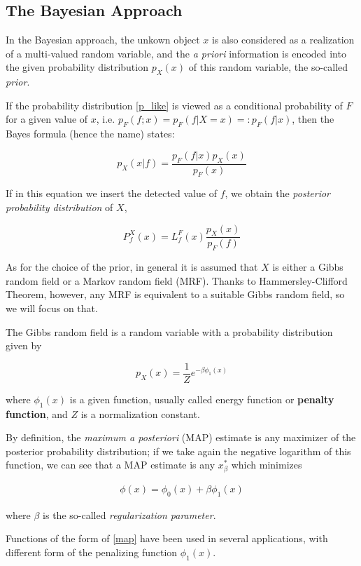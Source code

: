 \subsection{The Bayesian Approach}
\label{bayesian_framework}

In the Bayesian approach, the unkown object $x$ is also considered as a realization of a multi-valued random variable, and the \emph{a priori} information is encoded into the given probability distribution $p_X(x)$ of this random variable, the so-called \emph{prior}.

If the probability distribution \eqref{p_like} is viewed as a conditional probability of $F$ for a given value of $x$, i.e. $p_F (f;x) = p_F (f|X=x)  =: p_F(f|x)$, then the Bayes formula (hence the name) states:

$$p_X(x|f) = \dfrac{p_F(f|x)p_X(x)}{p_F(x)}$$

If in this equation we insert the detected value of $f$, we obtain the \emph{posterior probability distribution} of $X$,

$$P_f^X(x) = L_f^F(x)\dfrac{p_X(x)}{p_F(f)}$$

As for the choice of the prior, in general it is assumed that $X$ is either a Gibbs random field or a Markov random field (MRF). Thanks to Hammersley-Clifford Theorem, however, any MRF is equivalent to a suitable Gibbs random field, so we will focus on that.

The Gibbs random field is a random variable with a probability distribution given by

$$p_X(x) = \dfrac{1}{Z} e^{-\beta \phi_1(x)}$$

where $\phi_1(x)$ is a given function, usually called energy function or \textbf{penalty function}, and $Z$ is a normalization constant.

By definition, the \emph{maximum a posteriori} (MAP) estimate is any maximizer of the posterior probability distribution; if we take again the negative logarithm of this function, we can see that a MAP estimate is any $x_\beta^*$ which minimizes

\begin{align}
\label{map}
\phi(x) = \phi_0 (x)+ \beta \phi_1 (x)
\end{align}

where $\beta$ is the so-called \emph{regularization parameter}.

Functions of the form of \eqref{map} have been used in several applications, with different form of the penalizing function $\phi_1(x)$.

